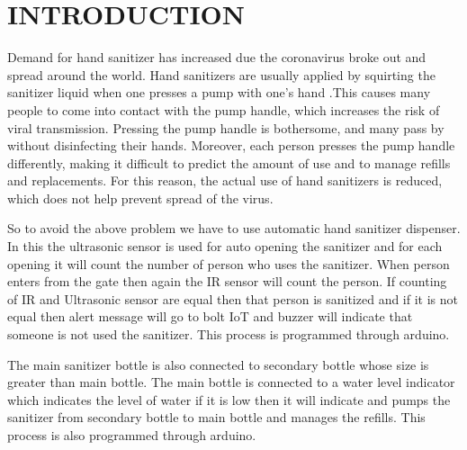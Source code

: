 
\chapter{INTRODUCTION}

   Demand for hand sanitizer has increased due the coronavirus broke out and spread around the world. Hand sanitizers are usually applied by squirting the sanitizer liquid when one presses a pump with one’s hand .This causes many people to come into contact with the pump handle, which increases the risk of viral transmission. Pressing the pump handle is bothersome, and many pass by without disinfecting their hands. Moreover, each person presses the pump handle differently, making it difficult to predict the amount of use and to manage refills and replacements. For this reason, the actual use of hand sanitizers is reduced, which does not help prevent spread of the virus.
   
   So to avoid the above problem we have to use automatic hand sanitizer dispenser. In this the ultrasonic sensor is used for auto opening the sanitizer and for each opening it will count the number of person who uses the sanitizer. When person enters from the gate then again the IR sensor will count the person. If counting of IR and Ultrasonic sensor are equal then that person is sanitized and if it is not equal then alert message will go to bolt IoT and buzzer will indicate that someone is not used the sanitizer. This process is programmed through arduino. 
    
   The main sanitizer bottle is also connected to secondary bottle whose size is greater than main bottle. The main bottle is connected to a water level indicator which indicates the level of water if it is low then it will indicate and pumps the sanitizer from secondary bottle to main bottle and manages the refills. This process is also programmed through arduino.


\vspace{0.6cm}


  

 


